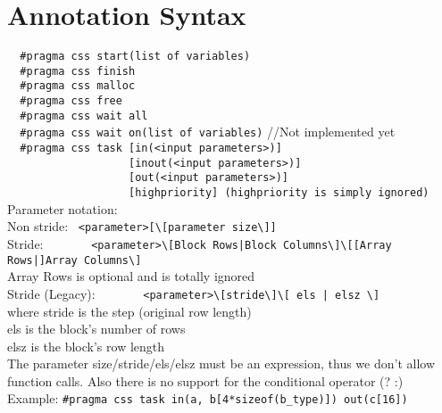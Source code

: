 \documentclass[a4paper]{article}
\begin{document}
\section{Annotation Syntax}

    \verb!  #pragma css start(list of variables)!\\
    \verb!  #pragma css finish!\\
    \verb!  #pragma css malloc!\\
    \verb!  #pragma css free!\\
    \verb!  #pragma css wait all!\\
    \verb!  #pragma css wait on(list of variables)! //Not implemented yet\\
    \verb!  #pragma css task [in(<input parameters>)]!\\
    \verb!                   [inout(<input parameters>)]!\\
    \verb!                   [out(<input parameters>)]!\\
    \verb!                   [highpriority] (highpriority is simply ignored)!\\[1em]
    Parameter notation:\\

      Non stride: \ \verb!<parameter>[\[parameter size\]]!\\
      
      Stride: \ \ \ \ \ \ \ \verb!<parameter>\[Block Rows|Block Columns\]\[[Array Rows|]Array Columns\]!\\
        \hspace{2cm}Array Rows is optional and is totally ignored\\
      
      Stride (Legacy): \ \ \ \ \ \ \ \verb!<parameter>\[stride\]\[ els | elsz \]!\\
        \hspace{2cm}where stride is the step (original row length)\\
        \hspace{2cm}els is the block's number of rows\\
        \hspace{2cm}elsz is the block's row length\\

      The parameter size/stride/els/elsz must be an expression, thus
      we don't allow function calls. Also there is no support for the
      conditional operator (? :)\\
      
    Example:
      \verb!#pragma css task in(a, b[4*sizeof(b_type)]) out(c[16])!
\end{document}

